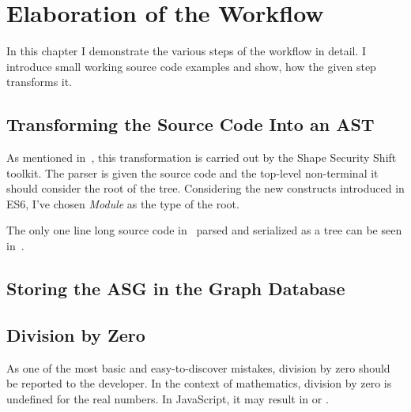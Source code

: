 \chapter{Elaboration of the Workflow}
\label{chap:elaboration-of-the-workflow}

In this chapter I demonstrate the various steps of the workflow in detail. I introduce small working source code examples and show, how the given step transforms it.

\section{Transforming the Source Code Into an AST}
As mentioned in~, this transformation is carried out by the Shape Security Shift toolkit. The parser is given the source code and the top-level non-terminal it should consider the root of the tree. Considering the new constructs introduced in ES6, I've chosen \emph{Module} as the type of the root.

The only one line long source code in~ parsed and serialized as a tree can be seen in~.

\begin{figure}[!ht]
	\begin{minipage}{\textwidth}
		
	\end{minipage}
\end{figure}

\begin{figure}[!ht]
	\begin{minipage}{\textwidth}
		
	\end{minipage}
\end{figure}

\section{Storing the ASG in the Graph Database}

\section{Division by Zero}
As one of the most basic and easy-to-discover mistakes, division by zero should be reported to the developer. In the context of mathematics, division by zero is undefined for the real numbers. In JavaScript, it may result in  or .

